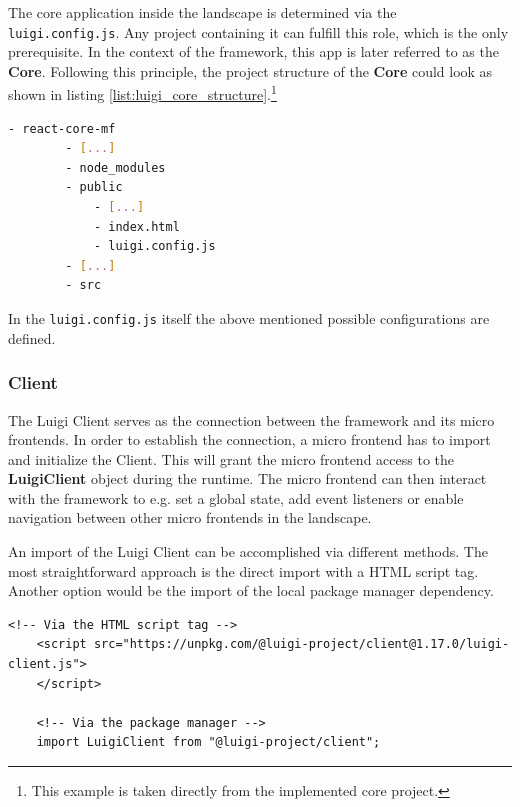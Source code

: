 The core application inside the landscape is determined via the \texttt{luigi.config.js}. Any project containing it can fulfill this role, which is the only prerequisite. In the context of the framework, this app is later referred to as the \textbf{Core}.
Following this principle, the project structure of the \textbf{Core} could look as shown in listing \ref{list:luigi_core_structure}.\footnote{This example is taken directly from the implemented core project.}  

\begin{lstlisting}[language=Bash, caption=Project structure for a Luigi Core application including the \texttt{luigi.config.js}, label=list:luigi_core_structure,  xleftmargin=.01\textwidth, xrightmargin=.01\textwidth]
	- react-core-mf
		- [...]
		- node_modules
		- public
			- [...]
			- index.html
			- luigi.config.js
		- [...]
		- src
\end{lstlisting}

In the \texttt{luigi.config.js} itself the above mentioned possible configurations are defined.\cite{luigi_doc_core}

\subsubsection{Client}

The Luigi Client serves as the connection between the framework and its micro frontends. In order to establish the connection, a micro frontend has to import and initialize the Client. This will grant the micro frontend access to the \textbf{LuigiClient} object during the runtime. The micro frontend can then interact with the framework to e.g. set a global state, add event listeners or enable navigation between other micro frontends in the landscape.

An import of the Luigi Client can be accomplished via different methods. The most straightforward approach is the direct import with a HTML script tag. Another option would be the import of the local package manager dependency.\cite{luigi_client}

\begin{lstlisting}[caption=Import methods of the Luigi Client, label=list:import_luigi_client,  xleftmargin=.01\textwidth, xrightmargin=.01\textwidth]
	<!-- Via the HTML script tag -->
	<script src="https://unpkg.com/@luigi-project/client@1.17.0/luigi-client.js">
	</script>
	
	<!-- Via the package manager -->
	import LuigiClient from "@luigi-project/client";
\end{lstlisting}

